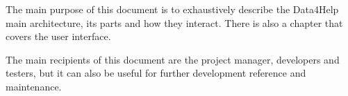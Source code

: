 The main purpose of this document is to exhaustively describe the Data4Help main architecture, its parts and how they interact. There is also a chapter that covers the user interface.

The main recipients of this document are the project manager, developers and testers, but it can also be useful for further development reference and maintenance.